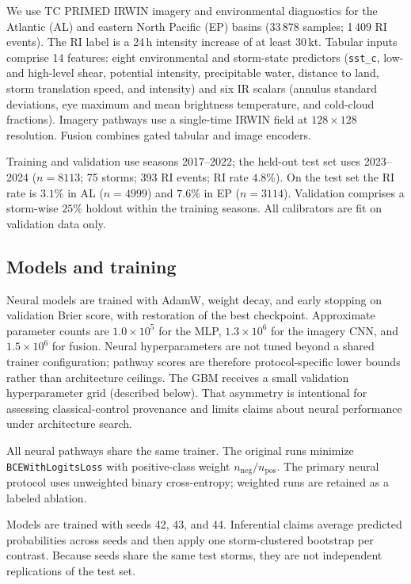 \documentclass[11pt]{article}
\begin{document}
We use {TC PRIMED} IRWIN imagery and environmental diagnostics \citep{razin2023,tcprimed} for the Atlantic (AL) and eastern North Pacific (EP) basins (33\,878 samples; 1\,409 RI events). The RI label is a 24\,h intensity increase of at least $30$\,kt. Tabular inputs comprise 14 features: eight environmental and storm-state predictors (\texttt{sst\_c}, low- and high-level shear, potential intensity, precipitable water, distance to land, storm translation speed, and intensity) and six IR scalars (annulus standard deviations, eye maximum and mean brightness temperature, and cold-cloud fractions). Imagery pathways use a single-time IRWIN field at $128\times 128$ resolution. Fusion combines gated tabular and image encoders.

Training and validation use seasons 2017--2022; the held-out test set uses 2023--2024 ($n=8113$; 75 storms; 393 RI events; RI rate $4.8\%$). On the test set the RI rate is $3.1\%$ in AL ($n=4999$) and $7.6\%$ in EP ($n=3114$). Validation comprises a storm-wise $25\%$ holdout within the training seasons. All calibrators are fit on validation data only.

\subsection{Models and training}

Neural models are trained with AdamW, weight decay, and early stopping on validation Brier score, with restoration of the best checkpoint. Approximate parameter counts are $1.0\times 10^5$ for the MLP, $1.3\times 10^6$ for the imagery CNN, and $1.5\times 10^6$ for fusion. Neural hyperparameters are not tuned beyond a shared trainer configuration; pathway scores are therefore protocol-specific lower bounds rather than architecture ceilings. The GBM receives a small validation hyperparameter grid (described below). That asymmetry is intentional for assessing classical-control provenance and limits claims about neural performance under architecture search.

All neural pathways share the same trainer. The original runs minimize \texttt{BCEWithLogitsLoss} with positive-class weight $n_{\mathrm{neg}}/n_{\mathrm{pos}}$. The primary neural protocol uses unweighted binary cross-entropy; weighted runs are retained as a labeled ablation.

Models are trained with seeds 42, 43, and 44. Inferential claims average predicted probabilities across seeds and then apply one storm-clustered bootstrap per contrast. Because seeds share the same test storms, they are not independent replications of the test set.
\end{document}
